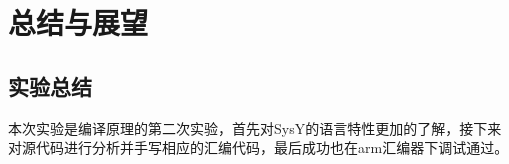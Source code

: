\documentclass[UTF8,a4paper,10pt]{ctexart}
\newcommand{\xiaosi}{\fontsize{12pt}{18pt}\selectfont}            %
\begin{document}



    






\newpage





\section{总结与展望}
\subsection{实验总结}
本次实验是编译原理的第二次实验，首先对SysY的语言特性更加的了解，接下来对源代码进行分析并手写相应的汇编代码，最后成功也在arm汇编器下调试通过。
\end{document}
